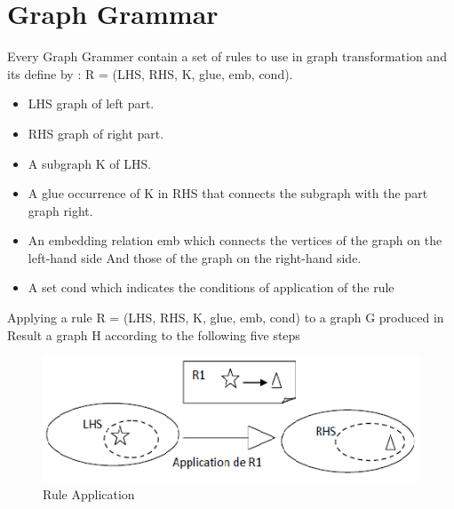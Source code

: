 \section{Graph Grammar} 
Every Graph Grammer contain a set of rules  to use in graph transformation
and its define by\cite{ch3-doc, ch3-spec} :
R = (LHS, RHS, K, glue, emb, cond). 
\begin{itemize}
\newcommand{\localtextbulletone}{\textcolor{gray}{\raisebox{.45ex}{\rule{.6ex}{.6ex}}}}
\renewcommand{\labelitemi}{\localtextbulletone}
\item LHS graph of left part.
\item RHS graph of right part.
\item A subgraph K of LHS.
\item A glue occurrence of K in RHS that connects the subgraph with the part graph  right.
\item An embedding relation emb which connects the vertices of the graph on the left-hand side
And those of the graph on the right-hand side.
\item A set cond which indicates the conditions of application of the rule
\end{itemize}

Applying a rule R = (LHS, RHS, K, glue, emb, cond) to a graph G produced in
Result a graph H according to the following five steps

\begin{figure}[th]
	\centering
		\includegraphics[scale=0.9]{ch3/img/rules}
	\caption{\label{fig:Rule Application}Rule Application\cite{ch3-img}}
\end{figure} 

